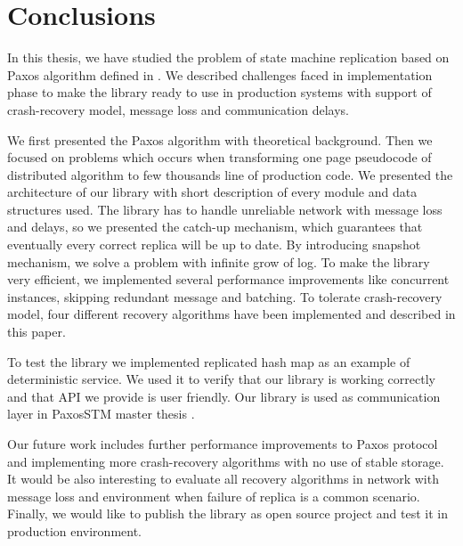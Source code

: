 \chapter{Conclusions}

In this thesis, we have studied the problem of state machine replication based
on Paxos algorithm defined in \cite{Lam98}. We described challenges faced in
implementation phase to make the library ready to use in production systems
with support of crash-recovery model, message loss and communication delays.

We first presented the Paxos algorithm with theoretical background. Then we
focused on problems which occurs when transforming one page pseudocode of
distributed algorithm to few thousands line of production code. We presented
the architecture of our library with short description of every module and data
structures used. The library has to handle unreliable network with message
loss and delays, so we presented the catch-up mechanism, which guarantees that
eventually every correct replica will be up to date. By introducing snapshot
mechanism, we solve a problem with infinite grow of log. To make the library
very efficient, we implemented several performance improvements like concurrent
instances, skipping redundant message and batching. To tolerate crash-recovery
model, four different recovery algorithms have been implemented and described in
this paper.

To test the library we implemented replicated hash map as an example of
deterministic service. We used it to verify that our library is working
correctly and that API we provide is user friendly. Our library is used as 
communication layer in PaxosSTM master thesis \cite{Tad10}.

Our future work includes further performance improvements to Paxos protocol and
implementing more crash-recovery algorithms with no use of stable storage.  It
would be also interesting to evaluate all recovery algorithms in network with
message loss and environment when failure of replica is a common scenario.
Finally, we would like to publish the library as open source project and test it
in production environment.

